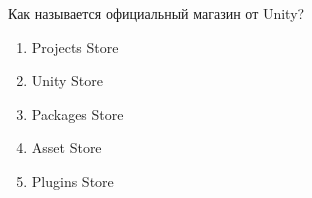 
Как называется официальный магазин от Unity?

\begin{enumerate}
    \item Projects Store
    \item Unity Store
    \item Packages Store
    \item Asset Store
    \item Plugins Store
\end{enumerate}